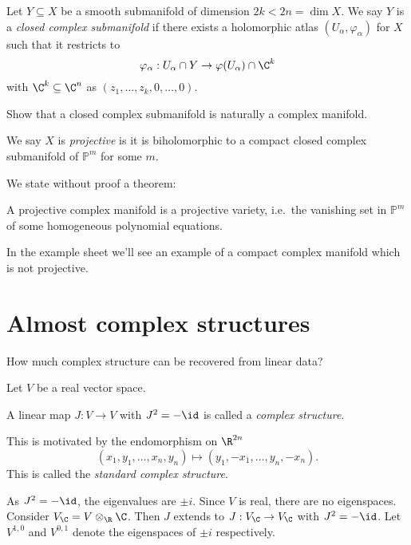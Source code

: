 \documentclass[a4paper]{article}
\renewcommand{\P}{\mathbb P} %
\begin{document}
\begin{definition}
  Let \(Y \subseteq X\) be a smooth submanifold of dimension \(2k < 2n = \dim X\). We say \(Y\) is a \emph{closed complex submanifold} if there exists a holomorphic atlas \((U_\alpha, \varphi_\alpha)\) for \(X\) such that it restricts to
  \[
    \varphi_\alpha: U_\alpha \cap Y \to \varphi(U_\alpha) \cap \C^k
  \]
  with \(\C^k \subseteq \C^n\) as \((z_1, \dots, z_k, 0, \dots, 0)\).
\end{definition}

\begin{ex}
  Show that a closed complex submanifold is naturally a complex manifold.
\end{ex}

\begin{definition}
  We say \(X\) is \emph{projective} is it is biholomorphic to a compact closed complex submanifold of \(\P^m\) for some \(m\).
\end{definition}

We state without proof a theorem:

\begin{theorem}[Chow]
  A projective complex manifold is a projective variety, i.e.\ the vanishing set in \(\P^m\) of some homogeneous polynomial equations.
\end{theorem}

In the example sheet we'll see an example of a compact complex manifold which is not projective.

\section{Almost complex structures}

How much complex structure can be recovered from linear data?

Let \(V\) be a real vector space.

\begin{definition}
  A linear map \(J: V \to V\) with \(J^2 = - \id\) is called a \emph{complex structure}.
\end{definition}

This is motivated by the endomorphism on \(\R^{2n}\)
\[
  (x_1, y_1, \dots, x_n, y_n) \mapsto (y_1, -x_1, \dots, y_n, -x_n).
\]
This is called the \emph{standard complex structure}.

As \(J^2 = -\id\), the eigenvalues are \(\pm i\). Since \(V\) is real, there are no eigenspaces. Consider \(V_\C = V \otimes_\R \C\). Then \(J\) extends to \(J: V_\C \to V_\C\) with \(J^2 = -\id\). Let \(V^{1, 0}\) and \(V^{0, 1}\) denote the eigenspaces of \(\pm i\) respectively.
\end{document}
